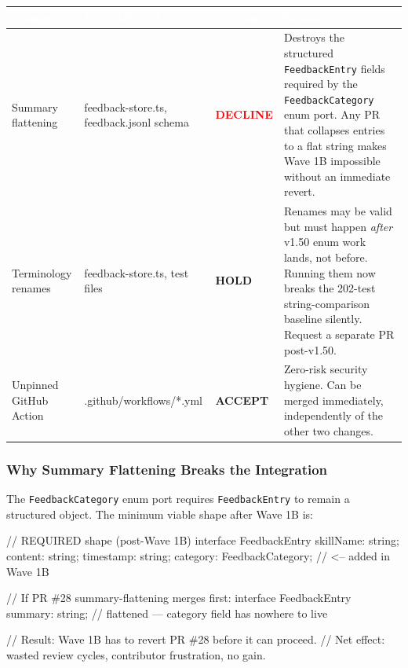 \documentclass[11pt,letterpaper]{article}
\newcommand{\tableheader}[1]{\textbf{\sffamily\textcolor{white}{#1}}}
\begin{document}
\begin{center}
\begin{tabularx}{\textwidth}{L{2.8cm}L{3cm}C{1.8cm}X}
\toprule
{}
\tableheader{Change} & \tableheader{Files Affected} & \tableheader{Decision} & \tableheader{Reason} \\
\midrule
Summary flattening & feedback-store.ts, feedback.jsonl schema & \textbf{\textcolor{red}{DECLINE}} & Destroys the structured \texttt{FeedbackEntry} fields required by the \texttt{FeedbackCategory} enum port. Any PR that collapses entries to a flat string makes Wave 1B impossible without an immediate revert. \\
Terminology renames & feedback-store.ts, test files & \textbf{\textcolor{warnyellow}{HOLD}} & Renames may be valid but must happen \textit{after} v1.50 enum work lands, not before. Running them now breaks the 202-test string-comparison baseline silently. Request a separate PR post-v1.50. \\
Unpinned GitHub Action & .github/workflows/*.yml & \textbf{\textcolor{successgreen}{ACCEPT}} & Zero-risk security hygiene. Can be merged immediately, independently of the other two changes. \\
\bottomrule
\end{tabularx}
\end{center}

\subsubsection{Why Summary Flattening Breaks the Integration}

The \texttt{FeedbackCategory} enum port requires \texttt{FeedbackEntry} to remain a structured object. The minimum viable shape after Wave 1B is:

\begin{asciibox}
  // REQUIRED shape (post-Wave 1B)
  interface FeedbackEntry {
    skillName:  string;
    content:    string;
    timestamp:  string;
    category:   FeedbackCategory;   // <-- added in Wave 1B
  }

  // If PR \#28 summary-flattening merges first:
  interface FeedbackEntry {
    summary: string;   // flattened — category field has nowhere to live
  }

  // Result: Wave 1B has to revert PR \#28 before it can proceed.
  // Net effect: wasted review cycles, contributor frustration, no gain.
\end{asciibox}
\end{document}
